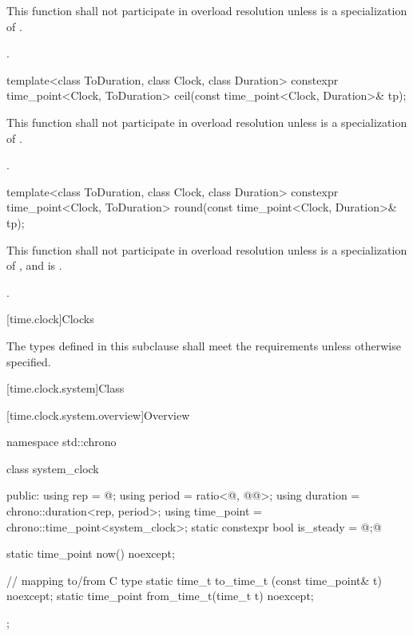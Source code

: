 \begin{itemdescr}
\pnum
\remarks
This function shall not participate in overload resolution
unless  is a specialization of .

\pnum
\returns
{}.
\end{itemdescr}

%
\begin{itemdecl}
template<class ToDuration, class Clock, class Duration>
  constexpr time_point<Clock, ToDuration> ceil(const time_point<Clock, Duration>& tp);
\end{itemdecl}

\begin{itemdescr}
\pnum
\remarks
This function shall not participate in overload resolution
unless  is a specialization of .

\pnum
\returns
{}.
\end{itemdescr}

%
\begin{itemdecl}
template<class ToDuration, class Clock, class Duration>
  constexpr time_point<Clock, ToDuration> round(const time_point<Clock, Duration>& tp);
\end{itemdecl}

\begin{itemdescr}
\pnum
\remarks
This function shall not participate in overload resolution
unless  is a specialization of , and
 is .

\pnum
\returns
{}.
\end{itemdescr}

[time.clock]{Clocks}

\pnum
The types defined in this subclause shall meet the
requirements
unless otherwise specified.

[time.clock.system]{Class }

[time.clock.system.overview]{Overview}
%

\begin{codeblock}
namespace std::chrono {
  class system_clock {
  public:
    using rep        = @\seebelow@;
    using period     = ratio<@\unspecnc@, @\unspec{}@>;
    using duration   = chrono::duration<rep, period>;
    using time_point = chrono::time_point<system_clock>;
    static constexpr bool is_steady = @\unspec;@

    static time_point now() noexcept;

    // mapping to/from C type 
    static time_t      to_time_t  (const time_point& t) noexcept;
    static time_point  from_time_t(time_t t) noexcept;
  };
}
\end{codeblock}


